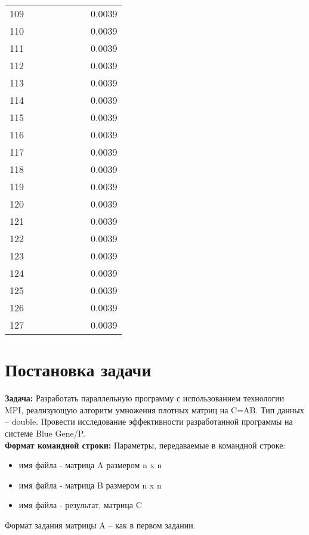 \documentclass[12pt]{article}
\begin{document}
\begin{center}
\begin{longtable}{|c|c|c|c|c|c|c|c|}
            109 &  &  &  &  &  &  & 0.0039 \\
            110 &  &  &  &  &  &  & 0.0039 \\
            111 &  &  &  &  &  &  & 0.0039 \\
            112 &  &  &  &  &  &  & 0.0039 \\
            113 &  &  &  &  &  &  & 0.0039 \\
            114 &  &  &  &  &  &  & 0.0039 \\
            115 &  &  &  &  &  &  & 0.0039 \\
            116 &  &  &  &  &  &  & 0.0039 \\
            117 &  &  &  &  &  &  & 0.0039 \\
            118 &  &  &  &  &  &  & 0.0039 \\
            119 &  &  &  &  &  &  & 0.0039 \\
            120 &  &  &  &  &  &  & 0.0039 \\
            121 &  &  &  &  &  &  & 0.0039 \\
            122 &  &  &  &  &  &  & 0.0039 \\
            123 &  &  &  &  &  &  & 0.0039 \\
            124 &  &  &  &  &  &  & 0.0039 \\
            125 &  &  &  &  &  &  & 0.0039 \\
            126 &  &  &  &  &  &  & 0.0039 \\
            127 &  &  &  &  &  &  & 0.0039 \\
            \hline
        \end{longtable}
    \end{center}
        
    \section{Постановка задачи}
        \textbf{Задача:} Разработать параллельную программу с использованием технологии MPI, реализующую
        алгоритм умножения плотных матриц на C=AB. Тип данных – double. Провести
        исследование эффективности разработанной программы на системе Blue Gene/P. \\

        \textbf{Формат командной строки:} Параметры, передаваемые в командной строке:
        \begin{itemize}
            \setlength{\itemsep}{1pt}
            \setlength{\parskip}{0pt}
            \setlength{\parsep}{0pt}
            \item имя файла - матрица A размером n x n
            \item имя файла - матрица B размером n x n
            \item имя файла - результат, матрица C
        \end{itemize}
        Формат задания матрицы A – как в первом задании. \\
\end{document}
